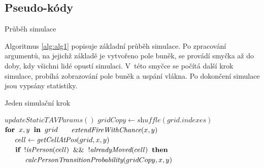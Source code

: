 \documentclass[11pt, titlepage, a4paper]{article}
\makeatletter
\def\BState{\State\hskip-\ALG@thistlm}
\makeatother
\begin{document}
    \subsection{Pseudo-kódy}
    \begin{algorithm}
    \caption{Průběh simulace}\label{euclid}
    \label{alg:alg1}
    \end{algorithm}
    
    Algoritmus \ref{alg:alg1} popisuje základní průběh simulace. Po zpracování argumentů, na jejichž základě je vytvořeno pole buněk, se provádí smyčka až do doby, kdy všichni lidé opustí simulaci. V~této smyčce se počítá další krok simulace, probíhá zobrazování pole buněk a uspání vlákna. Po dokončení simulace jsou vypsány statistiky.
    
    \begin{algorithm}
    \caption{Jeden simulační krok}\label{euclid}
    \label{alg:alg2}
    \begin{algorithmic}[1]
    \State $\textit{updateStaticTAVParams}()$
    \State $gridCopy \gets \textit{shuffle}(grid.indexes)$
    \State $\textbf{for} \hspace*{0.2cm} x,y \hspace*{0.2cm} \textbf{in} \hspace*{0.2cm} grid$ 
    \State $\hspace*{0.5cm}\textit{extendFireWithChance}(x, y)$
    \State $\hspace*{0.5cm}cell \gets \textit{getCellAtPos}(grid, x, y)$
    \State $\hspace*{0.5cm}\textbf{if}\hspace*{0.2cm}!\textit{isPerson}(cell)\hspace*{0.2cm}\&\&\hspace*{0.2cm}!\textit{alreadyMoved}(cell)\hspace*{0.2cm}\textbf{then}$
    \State $\hspace*{0.5cm}\hspace*{0.5cm}\textit{calcPersonTransitionProbability}(gridCopy, x, y)$
    \EndProcedure
    \end{algorithmic}
    \end{algorithm}
    
\end{document}
